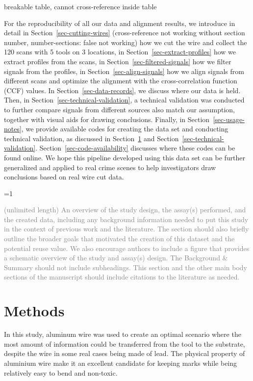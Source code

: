\documentclass[fleqn,10pt]{wlscirep}
\newcommand{\tom}[1]{{\textcolor{RedOrange}{#1}}}
\newcommand{\ifinstruction}{0} %
\begin{document}
\tom{breakable table, cannot cross-reference inside table}

For the reproducibility of all our data and alignment results, we
introduce in detail in Section~\ref{sec-cutting-wires}
\tom{(cross-reference not working without section number, number-sections: false not working)}
how we cut the wire and collect the 120 scans with 5 tools on 3
locations, in Section~\ref{sec-extract-profiles} how we extract profiles
from the scans, in Section~\ref{sec-filtered-signals} how we filter
signals from the profiles, in Section~\ref{sec-align-signals} how we
align signals from different scans and optimize the alignment with the
cross-correlation function (CCF) values. In
Section~\ref{sec-data-records}, we discuss where our data is held. Then,
in Section~\ref{sec-technical-validation}, a technical validation was
conducted to further compare signals from different sources also match
our assumption, together with visual aids for drawing conclusions.
Finally, in Section~\ref{sec-usage-notes}, we provide available codes
for creating the data set and conducting technical validation, as
discussed in Section~\ref{sec-methods} and
Section~\ref{sec-technical-validation}.
Section~\ref{sec-code-availability} discusses where these codes can be
found online. We hope this pipeline developed using this data set can be
further generalized and applied to real crime scenes to help
investigators draw conclusions based on real wire cut data.

\ifnum \ifinstruction=1

\textcolor{gray}{(unlimited length) An overview of the study design, the assay(s) performed, and the created data, including any background information needed to put this study in the context of previous work and the literature. The section should also briefly outline the broader goals that motivated the creation of this dataset and the potential reuse value. We also encourage authors to include a figure that provides a schematic overview of the study and assay(s) design. The Background \& Summary should not include subheadings. This section and the other main body sections of the manuscript should include citations to the literature as needed.}
\fi

\section{Methods}\label{sec-methods}

In this study, aluminum wire was used to create an optimal scenario
where the most amount of information could be transferred from the tool
to the substrate, despite the wire in some real cases being made of
lead. The physical property of aluminium wire make it an excellent
candidate for keeping marks while being relatively easy to bend and
non-toxic.
\end{document}

